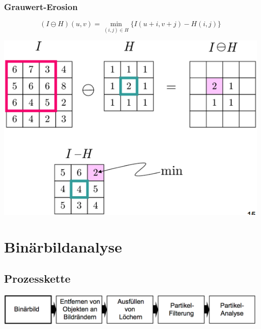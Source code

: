 \documentclass[10pt]{article}
\begin{document}
\subsubsection*{Grauwert-Erosion}
\begin{equation*}
	(I \ominus H)(u, v) = \min_{(i,j) \in H} \{ I(u+i,v+j) - H(i,j) \}
\end{equation*}
\begin{center}
	\includegraphics[scale=0.25]{grauwert-erosion.png}
\end{center}

\pagebreak
\section{Binärbildanalyse}

\subsection{Prozesskette}
\begin{center}
	\includegraphics[scale=0.25]{partikelprozesskette.png}
\end{center}
\end{document}
